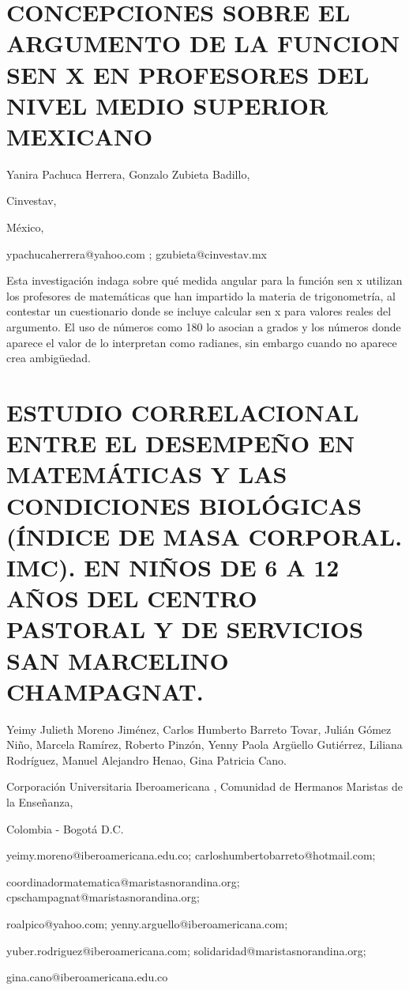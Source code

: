 \section{CONCEPCIONES SOBRE EL ARGUMENTO DE LA FUNCION SEN X EN PROFESORES
DEL NIVEL MEDIO SUPERIOR MEXICANO}

\begin{datos}

Yanira Pachuca Herrera, Gonzalo Zubieta Badillo,

Cinvestav,

México,

ypachucaherrera@yahoo.com ; gzubieta@cinvestav.mx 

\end{datos}

Esta investigación indaga sobre qué medida angular para la función
sen x utilizan los profesores de matemáticas que han impartido la
materia de trigonometría, al contestar un cuestionario donde se incluye
calcular sen x para valores reales del argumento. El uso de números
como 180 lo asocian a grados y los números donde aparece el valor
de lo interpretan como radianes, sin embargo cuando no aparece crea
ambigüedad. 


\section{ESTUDIO CORRELACIONAL ENTRE EL DESEMPEÑO EN MATEMÁTICAS Y LAS CONDICIONES
BIOLÓGICAS (ÍNDICE DE MASA CORPORAL. IMC). EN NIÑOS DE 6 A 12 AÑOS
DEL CENTRO PASTORAL Y DE SERVICIOS SAN MARCELINO CHAMPAGNAT.}

\begin{datos}

Yeimy Julieth Moreno Jiménez, Carlos Humberto Barreto Tovar, Julián
Gómez Niño, Marcela Ramírez, Roberto Pinzón, Yenny Paola Argüello
Gutiérrez, Liliana Rodríguez, Manuel Alejandro Henao, Gina Patricia
Cano.

Corporación Universitaria Iberoamericana , Comunidad de Hermanos Maristas
de la Enseñanza, 

Colombia - Bogotá D.C.

yeimy.moreno@iberoamericana.edu.co; carloshumbertobarreto@hotmail.com;

coordinadormatematica@maristasnorandina.org; cpschampagnat@maristasnorandina.org;

roalpico@yahoo.com; yenny.arguello@iberoamericana.com;

yuber.rodriguez@iberoamericana.com; solidaridad@maristasnorandina.org;

gina.cano@iberoamericana.edu.co 

\end{datos}

